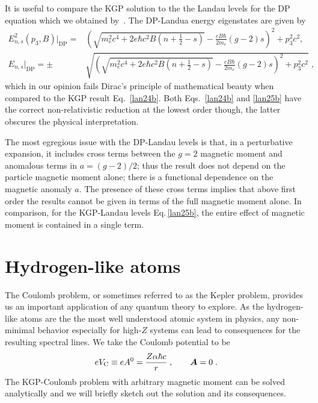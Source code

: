 It is useful to compare the KGP solution to the the Landau levels for the DP equation which we obtained by~\cite{Tsai:1971zma}. The DP-Landua energy eigenstates are given by
\begin{subequations}
\begin{alignat}{1}
\label{lan25} 
E^{2}_{n,s}(p_{3},B)|_\mathrm{DP} =&\left(\!\!\sqrt{\displaystyle m_{e}^{2}c^{4}\!+\!2e\hbar c^{2}B\left(n+\frac{1}{2}-s\right)}-\frac{eB\hbar}{2m_{e}}(g-2)s\!\right)^{2}\!\!\!+p_{3}^{\!\!2}c^{2},\\[0.4cm]
\label{lan25b}
E_{n,s}|_\mathrm{DP} =\pm &\sqrt{\!\left(\!\!\sqrt{\displaystyle m_{e}^{2}c^{4}+2e\hbar c^{2}B\left(n+\frac{1}{2}-s\right)}\!-\!\frac{eB\hbar}{2m_{e}}(g-2)s\!\right)^{\!\!2}\!\!\!+p_{3}^{2}c^{2}}\;,
\end{alignat}
\end{subequations}
which in our opinion fails Dirac's principle of mathematical beauty when compared to the KGP result Eq.~\eqref{lan24b}. Both Eqs.~\eqref{lan24b} and \eqref{lan25b} have the correct non-relativistic reduction at the lowest order though, the latter obscures the physical interpretation.

The most egregious issue with the DP-Landau levels is that, in a perturbative expansion, it includes cross terms between the $g\!=\!2$ magnetic moment and anomalous terms in $a=(g-2)/2$; thus the result does not depend on the particle magnetic moment alone; there is a functional dependence on the magnetic anomaly $a$. The presence of these cross terms implies that above first order the results cannot be given in terms of the full magnetic moment alone. In comparison, for the KGP-Landau levels Eq.\,\eqref{lan25b}, the entire effect of magnetic moment is contained in a single term.

\section{Hydrogen-like atoms}
\label{sec:coulomb}
The Coulomb problem, or sometimes referred to as the Kepler problem, provides us an important application of any quantum theory to explore. As the hydrogen-like atoms are the the most well understood atomic system in physics, any non-minimal behavior especially for high-$Z$ systems can lead to consequences for the resulting spectral lines. We take the Coulomb potential to be
\begin{equation}
	\label{eq:coulomb:01} eV_\mathrm{C}\equiv e A^{0}=\frac{Z \alpha\hbar c}{r}\;,\qquad \boldsymbol{A}=0\;.
\end{equation}
The KGP-Coulomb problem with arbitrary magnetic moment can be solved analytically and we will briefly sketch out the solution and its consequences.

